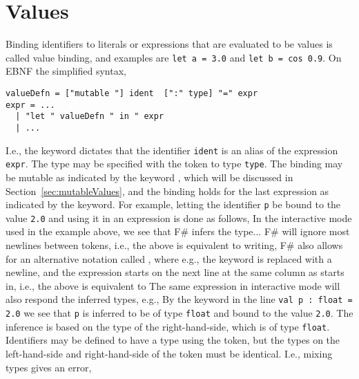 \section{Values}
Binding identifiers to literals or expressions that are evaluated to be values is called value binding, and examples are \lstinline!let a = 3.0! and \lstinline!let b = cos 0.9!. On EBNF the simplified syntax,
%
\begin{lstlisting}[language=ebnf]
valueDefn = ["mutable "] ident  [":" type] "=" expr
expr = ... 
  | "let " valueDefn " in " expr  
  | ...
\end{lstlisting}
I.e., the  keyword dictates that the identifier \lstinline[language=ebnf]!ident! is an alias of the expression \lstinline[language=ebnf]!expr!. The type may be specified with the \idx{\token{:}} token to type \lstinline[language=ebnf]!type!. The binding may be mutable as indicated by the keyword , which will be discussed in Section~\ref{sec:mutableValues}, and the binding holds  for the last expression as indicated by the  keyword. For example, letting the identifier \lstinline!p! be bound to the value \lstinline!2.0! and using it in an expression is done as follows,
%
%
In the interactive mode used in the example above, we see that F\# infers the type...
F\# will ignore most newlines between tokens, i.e., the above is equivalent to writing,
%
%
F\# also allows for an alternative notation called , where e.g., the  keyword is replaced with a newline, and the expression starts on the next line at the same column as  starts in, i.e., the above is equivalent to
%
%
The same expression in interactive mode will also respond the inferred types, e.g.,
%
%
By the  keyword in the line \lstinline!val p : float = 2.0! we see that \lstinline!p! is inferred to be of type \lstinline!float! and bound to the value \lstinline!2.0!. The inference is based on the type of the right-hand-side, which is of type \lstinline!float!.  Identifiers may be defined to have a type using the \token{:} token, but the types on the left-hand-side and right-hand-side of the \token{=} token must be identical. I.e., mixing types gives an error,
